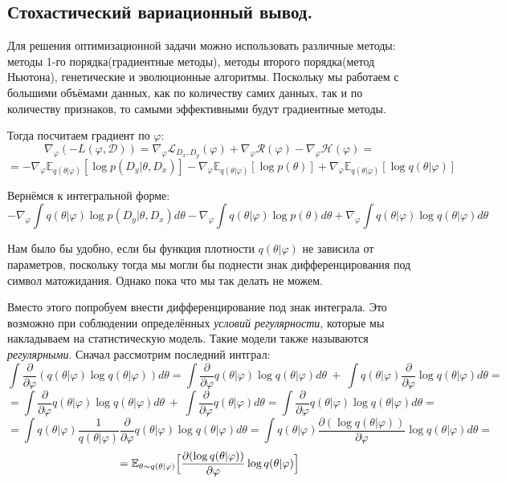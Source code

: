 \subsection{Стохастический вариационный вывод.} \label{SVI}

Для решения оптимизационной задачи можно использовать различные методы: методы 1-го порядка(градиентные методы), методы второго порядка(метод Ньютона), генетические и эволюционные алгоритмы. Поскольку мы работаем с большими объёмами данных,
 как по количеству самих данных, так и по количеству признаков, то самыми эффективными будут градиентные методы.

Тогда посчитаем градиент по $\varphi$:
$$\nabla_{\varphi} (-L(\varphi, \mathcal{D})) = \nabla_{\varphi} \mathcal{L}_{D_x, D_y}(\varphi) + \nabla_{\varphi} \mathcal{R}(\varphi) - \nabla_{\varphi} \mathcal{H}(\varphi)=$$
$$= -\nabla_{\varphi} \mathbb{E}_{q(\theta | \varphi)}[\log p(D_y | \theta, D_x)] - \nabla_{\varphi} \mathbb{E}_{q(\theta | \varphi)} [\log p(\theta)] +
\nabla_{\varphi} \mathbb{E}_{q(\theta | \varphi)} [\log q(\theta | \varphi)]$$

Вернёмся к интегральной форме:
$$-\nabla_{\varphi} \int q(\theta | \varphi) \log p(D_y | \theta, D_x) d\theta - \nabla_{\varphi} \int q(\theta | \varphi) \log p(\theta) d\theta + \nabla_{\varphi} \int q(\theta | \varphi) \log q(\theta | \varphi) d\theta$$

Нам было бы удобно, если бы функция плотности $q(\theta | \varphi)$ не зависила от параметров, поскольку тогда мы могли бы поднести знак дифференцирования под символ матожидания. Однако пока что мы так делать не можем.

Вместо этого попробуем внести дифференцирование под знак интеграла. Это возможно при соблюдении определённых \textit{условий регулярности}, которые мы накладываем на статистическую модель. Такие модели также называются
 \textit{регулярными}\cite{medvedev-stats}. Сначал рассмотрим последний интграл:
$$\int \frac{\partial}{\partial\varphi} (q(\theta | \varphi) \log q(\theta | \varphi)) d\theta = \int \frac{\partial}{\partial\varphi} q(\theta | \varphi) \log q(\theta | \varphi) d\theta\ +\ \int q(\theta | \varphi) \frac{\partial}{\partial\varphi} \log q(\theta | \varphi) d\theta =$$
$$=\int \frac{\partial}{\partial\varphi} q(\theta | \varphi) \log q(\theta | \varphi) d\theta\ +\ \int \frac{\partial}{\partial\varphi} q(\theta | \varphi) d\theta = \int \frac{\partial}{\partial\varphi} q(\theta | \varphi) \log q(\theta | \varphi) d\theta = $$
$$=\int q(\theta | \varphi) \frac{1}{q(\theta | \varphi)} \frac{\partial}{\partial\varphi} q(\theta | \varphi) \log q(\theta | \varphi) d\theta = \int q(\theta | \varphi) \frac{\partial(\log q(\theta | \varphi))}{\partial\varphi} \log q(\theta | \varphi) d\theta=$$
$$=\mathbb{E}_{\theta \sim q(\theta | \varphi)} \Bigl[\frac{\partial(\log q(\theta | \varphi))}{\partial\varphi} \log q(\theta | \varphi)\Bigr]$$

